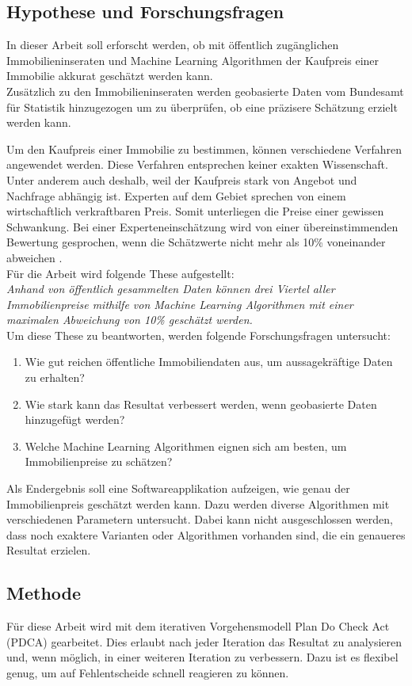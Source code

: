 \subsection{Hypothese und Forschungsfragen}
In dieser Arbeit soll erforscht werden, ob mit öffentlich zugänglichen Immobilieninseraten und Machine Learning Algorithmen der Kaufpreis einer Immobilie akkurat geschätzt werden kann.\\
Zusätzlich zu den Immobilieninseraten werden geobasierte Daten vom Bundesamt für Statistik hinzugezogen um zu überprüfen, ob eine präzisere Schätzung erzielt werden kann.

Um den Kaufpreis einer Immobilie zu bestimmen, können verschiedene Verfahren angewendet werden. Diese Verfahren entsprechen keiner exakten Wissenschaft. Unter anderem auch deshalb, weil der Kaufpreis stark von Angebot und Nachfrage abhängig ist. Experten auf dem Gebiet sprechen von einem wirtschaftlich verkraftbaren Preis. Somit unterliegen die Preise einer gewissen Schwankung. Bei einer Experteneinschätzung wird von einer übereinstimmenden Bewertung gesprochen, wenn die Schätzwerte nicht mehr als 10\% voneinander abweichen \cite{immo_1, immo_2}.\\[2ex]
%
Für die Arbeit wird folgende These aufgestellt:\\[2ex]
\textit{Anhand von öffentlich gesammelten Daten können drei Viertel aller Immobilienpreise mithilfe von Machine Learning Algorithmen mit einer maximalen Abweichung von 10\% geschätzt werden.}\\[4ex]
%
Um diese These zu beantworten, werden folgende Forschungsfragen untersucht:
\begin{enumerate}
\item Wie gut reichen öffentliche Immobiliendaten aus, um aussagekräftige Daten zu erhalten?
\item Wie stark kann das Resultat verbessert werden, wenn geobasierte Daten hinzugefügt werden?
\item Welche Machine Learning Algorithmen eignen sich am besten, um Immobilienpreise zu schätzen?
\end{enumerate}
Als Endergebnis soll eine Softwareapplikation aufzeigen, wie genau der Immobilienpreis geschätzt werden kann. Dazu werden diverse Algorithmen mit verschiedenen Parametern untersucht. Dabei kann nicht ausgeschlossen werden, dass noch exaktere Varianten oder Algorithmen vorhanden sind, die ein genaueres Resultat erzielen.
%
\subsection{Methode}
Für diese Arbeit wird mit dem iterativen Vorgehensmodell Plan Do Check Act (PDCA) gearbeitet. Dies erlaubt nach jeder Iteration das Resultat zu analysieren und, wenn möglich, in einer weiteren Iteration zu verbessern. Dazu ist es flexibel genug, um auf Fehlentscheide schnell reagieren zu können.
%
